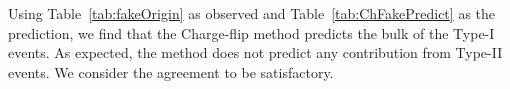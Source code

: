 Using Table~\ref{tab:fakeOrigin} as observed and Table~\ref{tab:ChFakePredict} as the 
prediction, we find that the Charge-flip method predicts the bulk of the Type-I events. As expected,
the method does not predict any contribution from Type-II events. 
We consider the agreement to be satisfactory.

